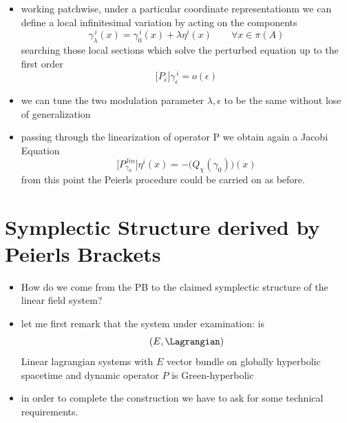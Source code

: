 \documentclass[a4paper,11pt]{scrartcl}
\begin{document}
\begin{itemize}
\begin{minipage}{0.5\textwidth}
\begin{itemize}
            \end{itemize}
        \end{minipage}    
        \item working patchwise, under a particular coordinate representationm we can define a local infinitesimal variation by acting on the components
        $$\gamma_\lambda ^{\, i}(x) = \gamma_0^{\, i}(x) + \lambda \eta^i(x) \qquad \forall x\in \pi(A) $$
        searching those local sections  which solve the perturbed equation up to the first order
        $$\big[ P_\epsilon \big] \gamma_\epsilon^{\,i} = o(\epsilon)$$
        \item we can tune the two modulation parameter $\lambda, \epsilon$ to be the same without lose of generalization
        \item passing through the linearization of operator P we obtain again a Jacobi Equation
        $$\biggr[P_{\gamma_0}^{\, lin} \biggr] \eta^i(x) = -\biggr(Q_\chi(\gamma_0)\biggr)(x)$$
        from this point the Peierls procedure could be carried on as before.
    \end{itemize}
    \newpage
    \section{Symplectic Structure derived by Peierls Brackets}
    \begin{itemize}
        \item How do we come from the PB to the claimed symplectic structure of the linear field system?
        \item let me first remark that the system under examination: is $$(E,\Lagrangian)$$ Linear lagrangian systems with $E$ vector bundle on globally hyperbolic spacetime and dynamic operator $P$ is Green-hyperbolic
        
        \item in order to complete the construction we have to ask for some technical requirements. 
    \end{itemize}
\end{document}
